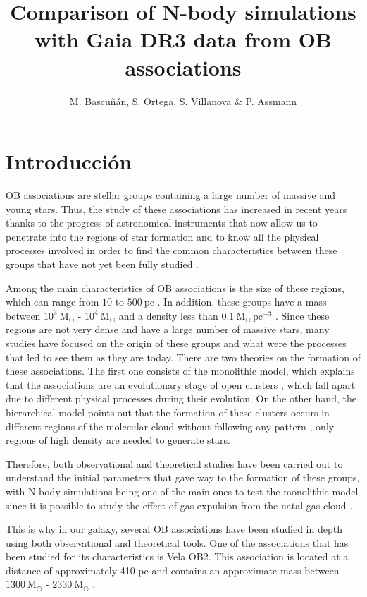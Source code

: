 \documentclass[baaa]{baaa}
\title{Comparison of N-body simulations with Gaia DR3 data from OB associations}
\author{
M. Bascuñán\inst{1},
S. Ortega\inst{1},
S. Villanova\inst{1}
\&
P. Assmann\inst{1}
}
\institute{
Universidad de Concepción, Chile
}
\begin{document}
\maketitle
\section{Introducci\'on}\label{S_intro}

OB associations are stellar groups containing a large number of massive and young stars. Thus, the study of these associations has increased in recent years thanks to the progress of astronomical instruments that now allow us to penetrate into the regions of star formation and to know all the physical processes involved in order to find the common characteristics between these groups that have not yet been fully studied \citep{wright}. 

Among the main characteristics of OB associations is the size of these regions, which can range from $10$ to $500~\mathrm{pc}$ \citep{M2020}. In addition, these groups have a mass between $10^3~\mathrm{M_{\odot}} $ - $10^4~\mathrm{M_{\odot}} $  and a density less than $0.1 ~\mathrm{M_{\odot}\, pc^{-3}}$ \citep{wright}.
Since these regions are not very dense and have a large number of massive stars, many studies have focused on the origin of these groups and what were the processes that led to see them as they are today. 
There are two theories on the formation of these associations. The first one consists of the monolithic model, which explains that the associations are an evolutionary stage of open clusters \citep{lada}, which fall apart due to different physical processes during their evolution. On the other hand, the hierarchical model points out that the formation of these clusters occurs in different regions of the molecular cloud without following any pattern \citep{kru}, only regions of high density are needed to generate stars.

Therefore, both observational and theoretical studies have been carried out to understand the initial parameters that gave way to the formation of these groups, with N-body simulations being one of the main ones to test the monolithic model \citep{brown} since it is possible to study the effect of gas expulsion from the natal gas cloud \citep{byk}. 

This is why in our galaxy, several OB associations have been studied in depth using both observational and theoretical tools. 
One of the associations that has been studied for its characteristics is Vela OB2. This association is located at a distance of approximately 410 pc \citep{zari} and contains an approximate mass between $1300~\mathrm{M_{\odot}} $ \cite{am} - $2330~\mathrm{M_{\odot}} $ \citep{cantat}.
\end{document}
